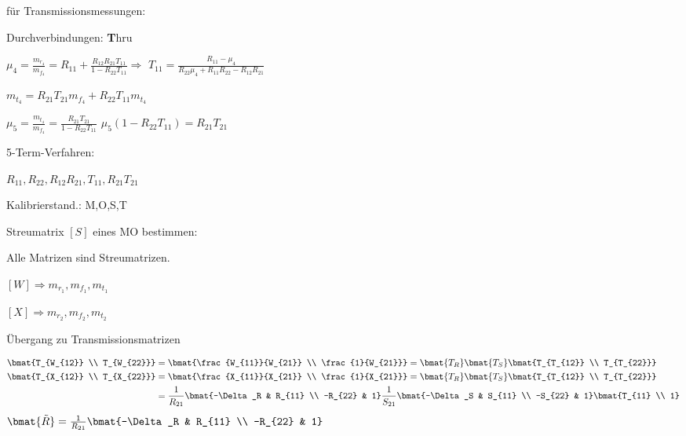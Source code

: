 für Transmissionsmessungen:
\begin{pitemize}
    \item Durchverbindungen: \textbf{T}hru
    \item $\mu_4 = \frac{m_{r_4}}{m_{f_4}} = R_{11} + \frac{R_{12}R_{21}T_{11}}{1-R_{22}T_{11}} \Rightarrow$
    \subitem $T_{11} = \frac{R_{11} - \mu_4}{R_{22}\mu_4 + R_{11}R_{22} - R_{12}R_{21}}$
    \item $m_{t_4} = R_{21}T_{21}m_{f_4} + R_{22}T_{11}m_{t_4}$
    \item $\mu_5 = \frac{m_{t_4}}{m_{f_4}} = \frac{R_{21}T_{21}}{1 - R_{22}T_{11}}$
    \subitem $\mu_5 (1- R_{22}T_{11}) = R_{21}T_{21}$
\end{pitemize}

5-Term-Verfahren:
\begin{pitemize}
    \item $R_{11}, R_{22}, R_{12}R_{21}, T_{11}, R_{21}T_{21}$
    \item Kalibrierstand.: M,O,S,T
\end{pitemize}


Streumatrix $[S]$ eines MO bestimmen:


Alle Matrizen sind Streumatrizen.
\begin{pitemize}
    \item $[W] \Rightarrow m_{r_1}, m_{f_1}, m_{t_1}$
    \item $[X] \Rightarrow m_{r_2}, m_{f_2}, m_{t_2}$
\end{pitemize}

Übergang zu Transmissionsmatrizen

\begin{align*}
    \bmat{T_{W_{12}} \\ T_{W_{22}}} &= \bmat{\frac{W_{11}}{W_{21}} \\ \frac{1}{W_{21}}} = \bmat{T_R}\bmat{T_S}\bmat{T_{T_{12}} \\ T_{T_{22}}} \\
    \bmat{T_{X_{12}} \\ T_{X_{22}}} &= \bmat{\frac{X_{11}}{X_{21}} \\ \frac{1}{X_{21}}} = \bmat{T_R}\bmat{T_S}\bmat{T_{T_{12}} \\ T_{T_{22}}} \\
    &= \frac{1}{R_{21}} \bmat{-\Delta_R & R_{11} \\ -R_{22} & 1} \frac{1}{S_{21}}\bmat{-\Delta_S & S_{11} \\ -S_{22} & 1} \bmat{T_{11} \\ 1} 
\end{align*}
$\bmat{\tilde{R}} = \frac{1}{R_{21}} \bmat{-\Delta_R & R_{11} \\ -R_{22} & 1}$

